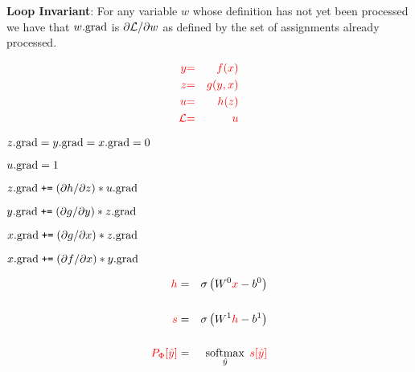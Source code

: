 {{}

\medskip
    {\bf Loop Invariant}: For any variable $w$ whose definition has not yet been processed we have that $w.\mathrm{grad}$ is $\partial {\cal L}/\partial w$ as defined by the set of assignments already processed.

\vspace{-3ex}
\begin{eqnarray*}
  {\color{red} y} & {\color{red} =} & {\color{red} f(x)} \\
  {\color{red} z} & {\color{red} =} & {\color{red} g(y,x)} \\
  {\color{red} u} & {\color{red} =} & {\color{red} h(z)} \\
  {\color{red} {\cal L}} & {\color{red} =} & {\color{red} u}
\end{eqnarray*}
{\color{red}
\medskip
$z.\mathrm{grad} = y.\mathrm{grad} = x.\mathrm{grad} = 0$

\medskip
$u.\mathrm{grad} = 1$

\medskip
$z.\mathrm{grad}\;\mbox{\tt +=}\; ({\partial h}/{\partial z}) * u.\mathrm{grad}$

\medskip
$y.\mathrm{grad} \;\mbox{\tt +=}\; ({\partial g}/{\partial y}) * z.\mathrm{grad}$

\medskip
$x.\mathrm{grad} \;\mbox{\tt +=}\; ({\partial g}/{\partial x}) * z.\mathrm{grad}$

\medskip
$x.\mathrm{grad} \;\mbox{\tt +=}\; ({\partial f}/{\partial x}) * y.\mathrm{grad}$
}



\begin{eqnarray*}
  {\color{red} h} & = & \sigma\left(W^0{\color{red} x} - b^0\right) \\
  \\
  {\color{red} s} & = & \sigma\left(W^1{\color{red} h} - b^1 \right) \\
  \\
  {\color{red} P_\Phi[\hat{y}]} & = & \operatorname*{softmax}_{\hat{y}}\;{\color{red} s[\hat{y}]}
\end{eqnarray*}

}

